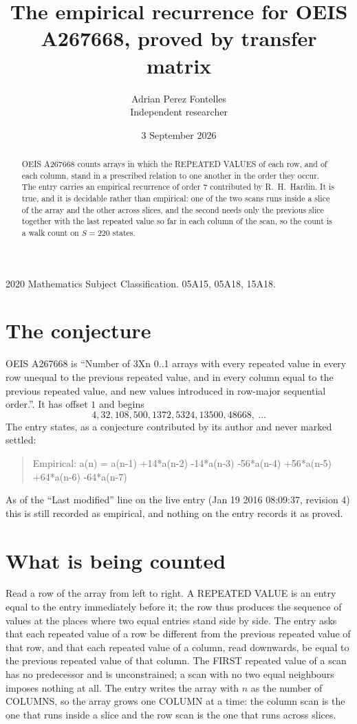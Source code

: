 \documentclass[11pt,a4paper]{article}
\title{The empirical recurrence for OEIS A267668, proved by transfer matrix}
\author{Adrian Perez Fontelles\\ \small Independent researcher}
\date{3 September 2026}
\theoremstyle{plain}
\theoremstyle{definition}
\begin{document}
\maketitle

\begin{abstract}
OEIS A267668 counts arrays in which the REPEATED VALUES of each row, and of each column, stand in a
prescribed relation to one another in the order they occur. The entry carries an empirical
recurrence of order $7$ contributed by R.~H.~Hardin. It is true, and it is decidable
rather than empirical: one of the two scans runs inside a slice of the array and the other
across slices, and the second needs only the previous slice together with the last repeated
value so far in each column of the scan, so the count is a walk count on $S=220$ states.
\end{abstract}

\noindent\small 2020 Mathematics Subject Classification. 05A15, 05A18, 15A18.\normalsize

\section{The conjecture}

OEIS A267668 is ``Number of 3Xn 0..1 arrays with every repeated value in every row unequal to the previous repeated value, and in every column equal to the previous repeated value, and new values introduced in row-major sequential order.''. It has offset $1$ and begins
\[
4, 32, 108, 500, 1372, 5324, 13500, 48668,\ \dots
\]
The entry states, as a conjecture contributed by its author and never marked settled:
\begin{quote}
Empirical: a(n) = a(n-1) +14*a(n-2) -14*a(n-3) -56*a(n-4) +56*a(n-5) +64*a(n-6) -64*a(n-7)
\end{quote}
As of the ``Last modified'' line on the live entry (Jan 19 2016 08:09:37, revision 4) this is still
recorded as empirical, and nothing on the entry records it as proved.

\section{What is being counted}

Read a row of the array from left to right. A REPEATED VALUE is an entry equal to the entry
immediately before it; the row thus produces the sequence of values at the places where two
equal entries stand side by side. The entry asks that each repeated value of a row be
different from the previous repeated value of that row, and that each repeated value of a column,
read downwards, be equal to the previous repeated value of that column. The FIRST repeated
value of a scan has no predecessor and is unconstrained; a scan with no two equal neighbours
imposes nothing at all. The entry writes the array with $n$ as the number of COLUMNS, so the array grows one COLUMN at a time: the column scan is the one that runs inside a slice and the row scan is the one that runs across slices.
\end{document}
